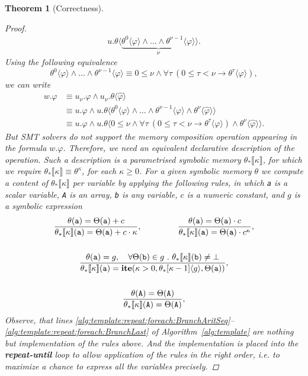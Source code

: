 \documentclass{sig-alternate}%
\newtheorem{thm}{Theorem}%
\newcommand{\ite}{\ensuremath{\mathbf{ite}}}
\newcommand{\var}[1]{{\tt #1}}
\newcommand{\prm}[1]{\ensuremath{\llbracket #1 \rrbracket}}
\newcommand{\ese}[1]{\ensuremath{\langle #1 \rangle}}
\begin{document}
\begin{thm}[Correctness]
\begin{proof}
\begin{align*}
u.\theta\ese{\underset{\nu}{\underbrace{\theta^0\ese{\varphi} \wedge
\ldots \wedge \theta^{\nu-1}\ese{\varphi}}}}.
\end{align*}
Using the following equivalence
\[\theta^0\ese{\varphi} \wedge \ldots \wedge
\theta^{\nu-1}\ese{\varphi} \equiv 0 \leq \nu \wedge \forall \tau~(0
\leq \tau < \nu \rightarrow \theta^{\tau}\ese{\varphi}),\]
we can write
\begin{align*}
w.\varphi &\equiv u_{\nu}.\varphi \wedge
u_{\nu}.\theta\ese{\hat{\varphi}} \\ &\equiv u.\varphi \wedge
u.\theta\ese{\theta^0\ese{\varphi} \wedge \ldots \wedge
\theta^{\nu-1}\ese{\varphi} \wedge \theta^{\nu}\ese{\hat{\varphi}}}
\\
&\equiv u.\varphi \wedge u.\theta\ese{0 \leq \nu \wedge \forall
\tau~(0 \leq \tau < \nu \rightarrow \theta^{\tau}\ese{\varphi}) \wedge
\theta^{\nu}\ese{\hat{\varphi}}}.
\end{align*}
But SMT solvers do not support the memory composition operation
appearing in the formula $w.\varphi$. Therefore, we need an equivalent
\emph{declarative} description of the operation. Such a description is
a parametrised symbolic memory $\theta_*\prm{\kappa}$, for which we
require $\theta_*\prm{\kappa} \equiv \theta^{\kappa}$, for each
$\kappa \geq 0$. For a given symbolic memory $\theta$ we compute a
content of $\theta_*\prm{\kappa}$ per variable by applying the
following rules, in which \var{a} is a scalar variable, \var{A} is an
array, \var{b} is any variable, $c$ is a numeric constant, and $g$ is
a symbolic expression
\begin{gather*}
\frac{\theta(\var{a}) = \Theta(\var{a}) + c%
}{\theta_*\prm{\kappa}(\var{a}) =
\Theta(\var{a}) + c \cdot \kappa},
~~~~~~~~~~~~~
\frac{\theta(\var{a}) = \Theta(\var{a}) \cdot c%
}{\theta_*\prm{\kappa}(\var{a}) =
\Theta(\var{a}) \cdot c^{\kappa}},
\\ \\
\frac{\theta(\var{a}) = g,~~~\forall \Theta(\var{b}) \in
g~.~\theta_*\prm{\kappa}(\var{b})\neq\bot}{\theta_*\prm{\kappa}(\var{a}) =
\ite(\kappa>0,\theta_*[\kappa-1]\langle g\rangle,\Theta(\var{a}))},
\\ \\
\frac{\theta(\var{A}) = \Theta(\var{A})%
}{\theta_*\prm{\kappa}(\var{A}) = \Theta(\var{A})},
\end{gather*}
Observe, that lines
\ref{alg:template:repeat:foreach:BranchAritSeq}--\ref{alg:template:repeat:foreach:BranchLast} of Algorithm~\ref{alg:template} are nothing but
implementation of the rules above. And the implementation is placed
into the \textbf{repeat-until} loop to allow application of the rules
in the right order, i.e. to maximize a chance to express \emph{all}
the variables precisely.


\end{proof}
\end{thm}
\end{document}

